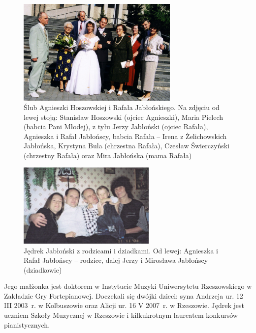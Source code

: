 \begin{figure}[!hb]
\begin{center}
\includegraphics[width=0.7\textwidth]{zdjecia/slub_rafala_i_agnieszki_jablonskich.jpg}
\caption[Ślub Agnieszki Hoszowskiej z Rafałem Jabłońskim]{Ślub Agnieszki Hoszowskiej i Rafała Jabłońskiego. Na zdjęciu od lewej stoją: Stanisław Hoszowski (ojciec Agnieszki), Maria Pielech (babcia Pani Młodej), z tyłu Jerzy Jabłoński (ojciec Rafała), Agnieszka i Rafał Jabłońscy, babcia Rafała -- Irena z Żelichowskich Jabłońska, Krystyna Bula (chrzestna Rafała), Czesław Świerczyński (chrzestny Rafała) oraz Mira Jabłońska (mama Rafała)}
\label{rys:slub_rafala_i_agnieszki_jablonskich}
\end{center}
\end{figure}

\begin{figure}[!ht]
\begin{center}
\includegraphics[width=0.6\textwidth]{zdjecia/jedrek_jakblonski_i_rodzina.jpg}
\caption[Jędrek Jabłoński z rodzicami i dziadkami]{Jędrek Jabłoński z rodzicami i dziadkami. Od lewej: Agnieszka i Rafał Jabłońscy -- rodzice, dalej Jerzy i Mirosława Jabłońscy (dziadkowie)}
\label{rys:jedrek_jakblonski_i_rodzina}
\end{center}
\end{figure}

Jego małżonka jest doktorem w Instytucie Muzyki Uniwersytetu Rzeszowskiego w Zakładzie Gry Fortepianowej.  Doczekali się dwójki dzieci: syna Andrzeja ur. 12 III 2003~r. w Kolbuszowie oraz Alicji ur. 16 V 2007~r. w Rzeszowie. Jędrek jest uczniem Szkoły Muzycznej w Rzeszowie i kilkukrotnym laureatem konkursów pianistycznych.





